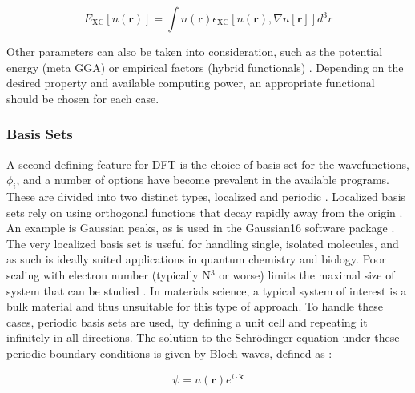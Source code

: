 \begin{equation}
E_{\mathrm{XC}}[n(\textbf{r})] = \int  n(\textbf{r}) \epsilon_{\mathrm{XC}}[n(\textbf{r}), \nabla n[\textbf{r}]] d^3r
\end{equation}


Other parameters can also be taken into consideration, such as the potential energy (meta GGA) or empirical factors (hybrid functionals) \cite{tao_climbing_2003, bj_pot}.  Depending on the desired property and available computing power, an appropriate functional should be chosen for each case.


\subsubsection{Basis Sets}
A second defining feature for DFT is the choice of basis set for the wavefunctions, $\phi_i$, and a number of options have become prevalent in the available programs.  These are divided into two distinct types, localized and periodic \cite{sholl_density_2009}.  Localized basis sets rely on using orthogonal functions that decay rapidly away from the origin \cite{sholl_density_2009}.  An example is Gaussian peaks, as is used in the Gaussian16 software package \cite{g16}.  The very localized basis set is useful for handling single, isolated molecules, and as such is ideally suited applications in quantum chemistry and biology. Poor scaling with electron number (typically N$^3$ or worse) limits the maximal size of system that can be studied \cite{mohr_linear_2018}.  In materials science, a typical system of interest is a bulk material and thus unsuitable for this type of approach.  To handle these cases, periodic basis sets are used, by defining a unit cell and repeating it infinitely in all directions.  The solution to the Schr\"odinger equation under these periodic boundary conditions is given by Bloch waves, defined as \cite{griffiths}:

\begin{equation}
	\psi = u(\textbf{r}) e^{i\cdot \textbf{k}}
\end{equation}

